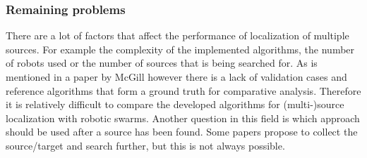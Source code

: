 	\subsubsection{Remaining problems}
	There are a lot of factors that affect the performance of localization of multiple sources.
	For example the complexity of the implemented algorithms, the number of robots used or the number of sources that is being searched for. 
	As is mentioned in a paper by McGill however there is a lack of validation cases and reference algorithms that form a ground truth for comparative analysis. \cite{mcgill2011robot} 
	Therefore it is relatively difficult to compare the developed algorithms for (multi-)source localization with robotic swarms. 
	Another question in this field is which approach should be used after a source has been found. 
	Some papers propose to collect the source/target and search further, but this is not always possible.